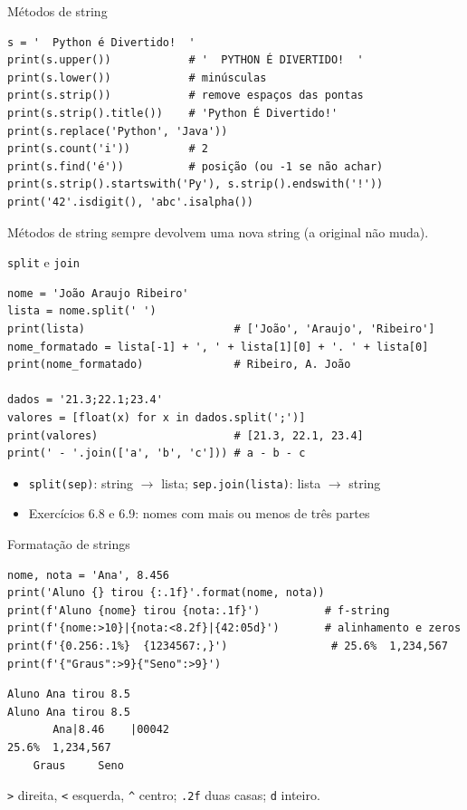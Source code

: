 \documentclass[aspectratio=169,10pt,t]{beamer}
\begin{document}
\begin{frame}[fragile]{Métodos de string}
\begin{lstlisting}
s = '  Python é Divertido!  '
print(s.upper())            # '  PYTHON É DIVERTIDO!  '
print(s.lower())            # minúsculas
print(s.strip())            # remove espaços das pontas
print(s.strip().title())    # 'Python É Divertido!'
print(s.replace('Python', 'Java'))
print(s.count('i'))         # 2
print(s.find('é'))          # posição (ou -1 se não achar)
print(s.strip().startswith('Py'), s.strip().endswith('!'))
print('42'.isdigit(), 'abc'.isalpha())
\end{lstlisting}
  \small Métodos de string \alert{sempre devolvem uma nova string} (a original não muda).
\end{frame}

\begin{frame}[fragile]{\texttt{split} e \texttt{join}}
\begin{lstlisting}
nome = 'João Araujo Ribeiro'
lista = nome.split(' ')
print(lista)                       # ['João', 'Araujo', 'Ribeiro']
nome_formatado = lista[-1] + ', ' + lista[1][0] + '. ' + lista[0]
print(nome_formatado)              # Ribeiro, A. João

dados = '21.3;22.1;23.4'
valores = [float(x) for x in dados.split(';')]
print(valores)                     # [21.3, 22.1, 23.4]
print(' - '.join(['a', 'b', 'c'])) # a - b - c
\end{lstlisting}
  \begin{itemize}
    \item \texttt{split(sep)}: string \(\to\) lista; \texttt{sep.join(lista)}: lista \(\to\) string
    \item Exercícios 6.8 e 6.9: nomes com mais ou menos de três partes
  \end{itemize}
\end{frame}

\begin{frame}[fragile]{Formatação de strings}
\begin{lstlisting}
nome, nota = 'Ana', 8.456
print('Aluno {} tirou {:.1f}'.format(nome, nota))
print(f'Aluno {nome} tirou {nota:.1f}')          # f-string
print(f'{nome:>10}|{nota:<8.2f}|{42:05d}')       # alinhamento e zeros
print(f'{0.256:.1%}  {1234567:,}')                # 25.6%  1,234,567
print(f'{"Graus":>9}{"Seno":>9}')
\end{lstlisting}
\begin{lstlisting}[style=saida]
Aluno Ana tirou 8.5
Aluno Ana tirou 8.5
       Ana|8.46    |00042
25.6%  1,234,567
    Graus     Seno
\end{lstlisting}
  \small \texttt{>} direita, \texttt{<} esquerda, \texttt{\^} centro; \texttt{.2f} duas casas; \texttt{d} inteiro.\\
\end{frame}
\end{document}
